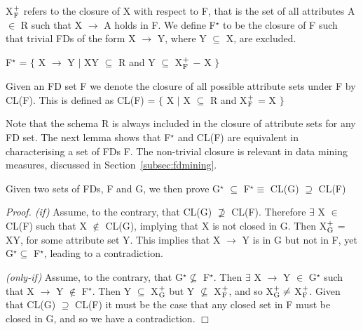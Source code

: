 X$_{\rm F}^+$ refers to the closure of X with respect to F, that is
the set of all attributes A $\in$ R such that X $\to$ A holds in F.
We define F$^\star$ to be the closure of F such that trivial
FDs of the form X $\to$ Y, where Y $\subseteq$ X, are excluded.

\begin{definition}
\begin{rm}
F$^\star$ = $\{$ X $\to$ Y $\mid$ XY $\subseteq$ R and Y $\subseteq$
X$_{\rm F}^+$ $-$  X $\}$
\end{rm}
\end{definition}

\begin{definition}
\begin{rm}
Given an FD set F we denote the closure of all possible
attribute sets under F by CL(F). This is defined as
CL(F) = $\{$ X $\mid$ X $\subseteq$ R and X$_{\rm F}^+$ = X $\}$
\end{rm}
\end{definition}

Note that the schema R is always included in the closure of attribute
sets for any FD set. The next lemma shows that F$^\star$ and 
CL(F) are equivalent in characterising a set of FDs F. The
non-trivial closure is relevant in data mining measures,
discussed in Section~\ref{subsec:fdmining}.

\begin{lemma}
\begin{rm}
Given two sets of FDs, F and G, we then prove 
G$^\star$ $\subseteq$ F$^\star \equiv$ CL(G) $\supseteq$ CL(F)
\end{rm}
\end{lemma}

{\em Proof. (if) }
Assume, to the contrary, that CL(G) $\not\supseteq$ CL(F).
Therefore $\exists$ X $\in$ CL(F) such that X $\not\in$ CL(G), implying
that X is not closed in G. 
Then X$_{\rm G}^+$ = XY, for some attribute set Y.
 This implies that X $\to$ Y is in G but
not in F, yet G$^\star \subseteq$ F$^\star$, leading to a
contradiction.

\smallskip
{\em (only-if)}
Assume, to the contrary, that G$^\star \not\subseteq$ F$^\star$. 
Then $\exists$ X $\to$ Y $\in$ G$^\star$ such that X $\to$ Y $\not\in$
F$^\star$. 
Then Y $\subseteq$ X$_{\rm G}^+$ but Y $\not\subseteq$ X$_{\rm F}^+$, 
and so X$^+_{\rm G} \not=$ X$^+_{\rm F}$.
Given that CL(G) $\supseteq$ CL(F) it must be the case that 
any closed set in F
must be closed in G, and so we have a contradiction. $\Box$

